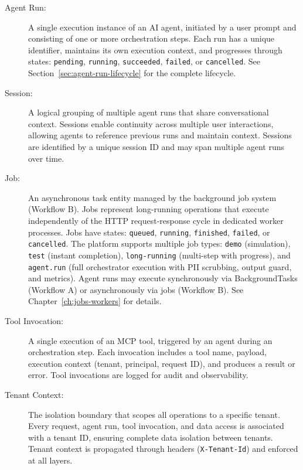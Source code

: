 \documentclass[a4paper,twoside]{sapthesis}
\begin{document}
\begin{description}
    \item[Agent Run:] A single execution instance of an AI agent, initiated by a user prompt and consisting of one or more orchestration steps. Each run has a unique identifier, maintains its own execution context, and progresses through states: \texttt{pending}, \texttt{running}, \texttt{succeeded}, \texttt{failed}, or \texttt{cancelled}. See Section~\ref{sec:agent-run-lifecycle} for the complete lifecycle.
    
    \item[Session:] A logical grouping of multiple agent runs that share conversational context. Sessions enable continuity across multiple user interactions, allowing agents to reference previous runs and maintain context. Sessions are identified by a unique session ID and may span multiple agent runs over time.
    
    \item[Job:] An asynchronous task entity managed by the background job system (Workflow B). Jobs represent long-running operations that execute independently of the HTTP request-response cycle in dedicated worker processes. Jobs have states: \texttt{queued}, \texttt{running}, \texttt{finished}, \texttt{failed}, or \texttt{cancelled}. The platform supports multiple job types: \texttt{demo} (simulation), \texttt{test} (instant completion), \texttt{long-running} (multi-step with progress), and \texttt{agent.run} (full orchestrator execution with PII scrubbing, output guard, and metrics). Agent runs may execute synchronously via BackgroundTasks (Workflow A) or asynchronously via jobs (Workflow B). See Chapter~\ref{ch:jobs-workers} for details.
    
    \item[Tool Invocation:] A single execution of an MCP tool, triggered by an agent during an orchestration step. Each invocation includes a tool name, payload, execution context (tenant, principal, request ID), and produces a result or error. Tool invocations are logged for audit and observability.
    
    \item[Tenant Context:] The isolation boundary that scopes all operations to a specific tenant. Every request, agent run, tool invocation, and data access is associated with a tenant ID, ensuring complete data isolation between tenants. Tenant context is propagated through headers (\texttt{X-Tenant-Id}) and enforced at all layers.
    

\end{description}
\end{document}
